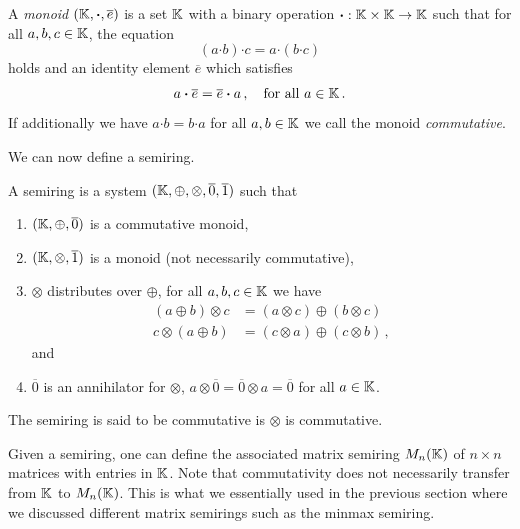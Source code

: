 \begin{definition*}
  A \emph{monoid} $(\mathbb{K}, \boldsymbol{\cdot}, \overline{e})$ is a set
  $\mathbb{K}$ with a binary operation
  $\boldsymbol{\cdot} : \mathbb{K} \times \mathbb{K} \rightarrow \mathbb{K}$ such that for all
  $a,b,c \in \mathbb{K}$, the equation
  \begin{equation*}
    (a \boldsymbol{\cdot} b) \boldsymbol{\cdot} c = a \boldsymbol{\cdot} (b \boldsymbol{\cdot} c)
  \end{equation*}
  holds and an identity element $\overline{e}$ which satisfies
  \begin{equation*}
    a \boldsymbol{\cdot} \overline{e} = \overline{e} \boldsymbol{\cdot} a\,, \quad \text{for all } a \in \mathbb{K}\,.
  \end{equation*}
  If additionally we have
  $a\boldsymbol{\cdot}b = b \boldsymbol{\cdot} a$ for all $a,b \in \mathbb{K}$
  we call the monoid \emph{commutative}.
\end{definition*}
We can now define a semiring.
\begin{definition*}
  A semiring is a system
  $(\mathbb{K},\oplus,\otimes,\overline{0},\overline{1})$ such that
  \begin{enumerate}
  \item $(\mathbb{K}, \oplus, \overline{0})$ is a commutative monoid,
  \item $(\mathbb{K}, \otimes, \overline{1})$ is a monoid (not necessarily
    commutative),
  \item $\otimes$ distributes over $\oplus$, \ie for all
    $a,b,c \in \mathbb{K}$ we have
    \begin{align*}
      (a \oplus b) \otimes c &= (a \otimes c) \oplus (b \otimes c) \\
      c \otimes (a \oplus b) &= (c \otimes a) \oplus (c \otimes b)\,,
    \end{align*}
    and
  \item $\overline{0}$ is an annihilator for $\otimes$, \ie
    $a \otimes \overline{0} = \overline{0} \otimes a = \overline{0}$
    for all $a \in \mathbb{K}$.
  \end{enumerate}
  The semiring is said to be commutative is $\otimes$ is commutative.
\end{definition*}
Given a semiring, one can define the associated matrix semiring
$M_n(\mathbb{K})$ of $n \times n$ matrices with entries in $\mathbb{K}$. Note that
commutativity does not necessarily transfer from $\mathbb{K}$ to $M_n(\mathbb{K})$.
This is what we essentially used in the previous section where we
discussed different matrix semirings such as the minmax semiring.

